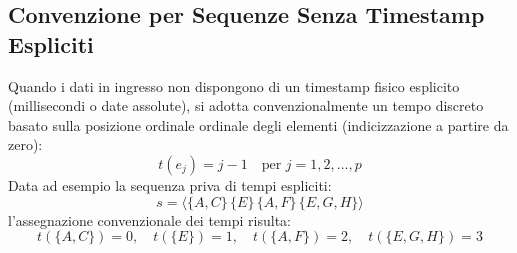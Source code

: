 \FloatBarrier
\subsection{Convenzione per Sequenze Senza Timestamp Espliciti}
Quando i dati in ingresso non dispongono di un timestamp fisico esplicito (millisecondi o date assolute), si adotta convenzionalmente un tempo discreto basato sulla posizione ordinale ordinale degli elementi (indicizzazione a partire da zero):
\begin{equation}
t(e_j) = j - 1 \quad \text{per } j = 1, 2, \dots, p
\end{equation}
Data ad esempio la sequenza priva di tempi espliciti:
\begin{equation}
s = \langle \{A, C\} \, \{E\} \, \{A, F\} \, \{E, G, H\} \rangle
\end{equation}
l'assegnazione convenzionale dei tempi risulta:
\begin{equation*}
t(\{A, C\}) = 0, \quad t(\{E\}) = 1, \quad t(\{A, F\}) = 2, \quad t(\{E, G, H\}) = 3
\end{equation*}

\FloatBarrier
